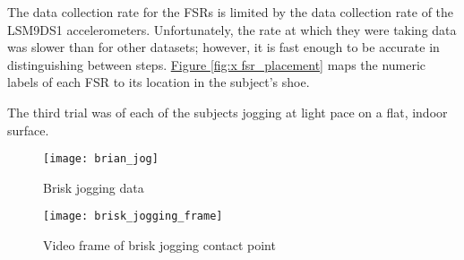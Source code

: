 The data collection rate for the FSRs is limited by the data collection rate of the LSM9DS1 accelerometers.
Unfortunately, the rate at which they were taking data was slower than for other datasets; however, it is fast enough to be accurate in distinguishing between steps.
\hyperref[{fig:x fsr_placement}]{Figure \ref*{fig:x fsr_placement}} maps the numeric labels of each FSR to its location in the subject’s shoe.\par

The third trial was of each of the subjects jogging at light pace on a flat, indoor surface.\par

\begin{figure}[p]
  \centering
  \texttt{[image: brian\_jog]}
  \caption[Brisk jogging data]{Brisk jogging data}
  \label{fig:x brisk data}
\end{figure}

\begin{figure}[h]
  \centering
  \texttt{[image: brisk\_jogging\_frame]}
  \caption[Brisk jogging frame]{Video frame of brisk jogging contact point}
  \label{fig:x brisk frame}
\end{figure}
